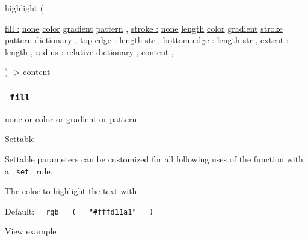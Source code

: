 { highlight } (

{ \hyperref[parameters-fill]{fill :}
\href{/docs/reference/foundations/none/}{none}
\href{/docs/reference/visualize/color/}{color}
\href{/docs/reference/visualize/gradient/}{gradient}
\href{/docs/reference/visualize/pattern/}{pattern} , } {
\hyperref[parameters-stroke]{stroke :}
\href{/docs/reference/foundations/none/}{none}
\href{/docs/reference/layout/length/}{length}
\href{/docs/reference/visualize/color/}{color}
\href{/docs/reference/visualize/gradient/}{gradient}
\href{/docs/reference/visualize/stroke/}{stroke}
\href{/docs/reference/visualize/pattern/}{pattern}
\href{/docs/reference/foundations/dictionary/}{dictionary} , } {
\hyperref[parameters-top-edge]{top-edge :}
\href{/docs/reference/layout/length/}{length}
\href{/docs/reference/foundations/str/}{str} , } {
\hyperref[parameters-bottom-edge]{bottom-edge :}
\href{/docs/reference/layout/length/}{length}
\href{/docs/reference/foundations/str/}{str} , } {
\hyperref[parameters-extent]{extent :}
\href{/docs/reference/layout/length/}{length} , } {
\hyperref[parameters-radius]{radius :}
\href{/docs/reference/layout/relative/}{relative}
\href{/docs/reference/foundations/dictionary/}{dictionary} , } {
\href{/docs/reference/foundations/content/}{content} , }

) -\textgreater{} \href{/docs/reference/foundations/content/}{content}

\subsubsection{\texorpdfstring{\texttt{\ fill\ }}{ fill }}\label{parameters-fill}

\href{/docs/reference/foundations/none/}{none} {or}
\href{/docs/reference/visualize/color/}{color} {or}
\href{/docs/reference/visualize/gradient/}{gradient} {or}
\href{/docs/reference/visualize/pattern/}{pattern}

{{ Settable }}

\label{parameters-fill-settable-tooltip}
Settable parameters can be customized for all following uses of the
function with a \texttt{\ set\ } rule.

The color to highlight the text with.

Default:
\texttt{\ }{\texttt{\ rgb\ }}\texttt{\ }{\texttt{\ (\ }}\texttt{\ }{\texttt{\ "\#fffd11a1"\ }}\texttt{\ }{\texttt{\ )\ }}\texttt{\ }


View example

